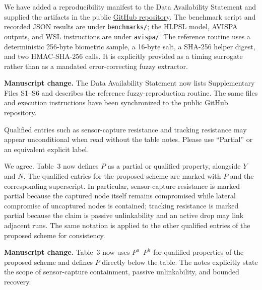 \begin{revresponse}
We have added a reproducibility manifest to the Data Availability Statement and supplied the artifacts in the public \href{https://github.com/secagg4AsyncFL/A-Lightweight-Four-Credential-Authentication-and-Key-Agreement-Protocol-for-AI-Enabled-Edge-IIoT}{GitHub repository}. The benchmark script and recorded JSON results are under \texttt{benchmarks/}; the HLPSL model, AVISPA outputs, and WSL instructions are under \texttt{avispa/}. The reference routine uses a deterministic 256-byte biometric sample, a 16-byte salt, a SHA-256 helper digest, and two HMAC-SHA-256 calls. It is explicitly provided as a timing surrogate rather than as a mandated error-correcting fuzzy extractor.
\end{revresponse}
\begin{changes}
\textbf{Manuscript change.} The Data Availability Statement now lists Supplementary Files S1--S6 and describes the reference fuzzy-reproduction routine. The same files and execution instructions have been synchronized to the public GitHub repository.
\end{changes}

\begin{revcomment}
Qualified entries such as sensor-capture resistance and tracking resistance may appear unconditional when read without the table notes. Please use ``Partial'' or an equivalent explicit label.
\end{revcomment}

\begin{revresponse}
We agree. Table~3 now defines $P$ as a partial or qualified property, alongside $Y$ and $N$. The qualified entries for the proposed scheme are marked with $P$ and the corresponding superscript. In particular, sensor-capture resistance is marked partial because the captured node itself remains compromised while lateral compromise of uncaptured nodes is contained; tracking resistance is marked partial because the claim is passive unlinkability and an active drop may link adjacent runs. The same notation is applied to the other qualified entries of the proposed scheme for consistency.
\end{revresponse}
\begin{changes}
\textbf{Manuscript change.} Table~3 now uses $P^a$--$P^h$ for qualified properties of the proposed scheme and defines $P$ directly below the table. The notes explicitly state the scope of sensor-capture containment, passive unlinkability, and bounded recovery.
\end{changes}

